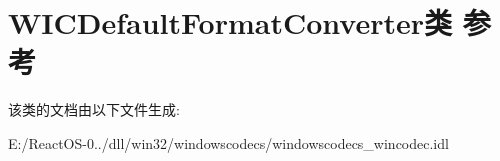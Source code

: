 \hypertarget{class_w_i_c_default_format_converter}{}\section{W\+I\+C\+Default\+Format\+Converter类 参考}
\label{class_w_i_c_default_format_converter}


该类的文档由以下文件生成\+:\begin{DoxyCompactItemize}
\item 
E\+:/\+React\+O\+S-\/0../dll/win32/windowscodecs/windowscodecs\+\_\+wincodec.\+idl\end{DoxyCompactItemize}
